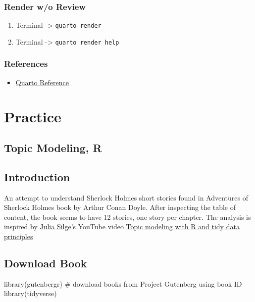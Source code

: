 \documentclass[
  letterpaper,
  DIV=11,
  numbers=noendperiod]{scrreprt}
\newenvironment{Shaded}{\begin{snugshade}}{\end{snugshade}}
\newcommand{\CommentTok}[1]{\textcolor[rgb]{0.37,0.37,0.37}{#1}}
\newcommand{\FunctionTok}[1]{\textcolor[rgb]{0.28,0.35,0.67}{#1}}
\newcommand{\NormalTok}[1]{\textcolor[rgb]{0.00,0.23,0.31}{#1}}
\providecommand{\tightlist}{%
  \setlength{\itemsep}{0pt}\setlength{\parskip}{0pt}}\usepackage{longtable,booktabs,array}
\begin{document}
\section{Render w/o Review}\label{render-wo-review}

\begin{enumerate}
\def\labelenumi{\arabic{enumi}.}
\tightlist
\item
  Terminal -\textgreater{} \texttt{quarto\ render}
\item
  Terminal -\textgreater{} \texttt{quarto\ render\ help}
\end{enumerate}

\section{References}\label{references-1}

\begin{itemize}
\tightlist
\item
  \href{https://quarto.org/docs/reference/}{Quarto Reference}
\end{itemize}

\part{Practice}

\chapter{Topic Modeling, R}\label{topic-modeling-r}

\chapter{Introduction}\label{introduction}

An attempt to understand Sherlock Holmes short stories found in
Adventures of Sherlock Holmes book by Arthur Conan Doyle. After
inspecting the table of content, the book seems to have 12 stories, one
story per chapter. The analysis is inspired by
\href{https://juliasilge.com/}{Julia Silge}'s YouTube video
\href{https://www.youtube.com/watch?v=evTuL-RcRpc&t=321s}{Topic modeling
with R and tidy data principles}

\chapter{Download Book}\label{download-book}

\begin{Shaded}
\begin{Highlighting}[]
\FunctionTok{library}\NormalTok{(gutenbergr)  }\CommentTok{\# download books from Project Gutenberg using book ID}
\FunctionTok{library}\NormalTok{(tidyverse)}
\end{Highlighting}
\end{Shaded}
\end{document}

